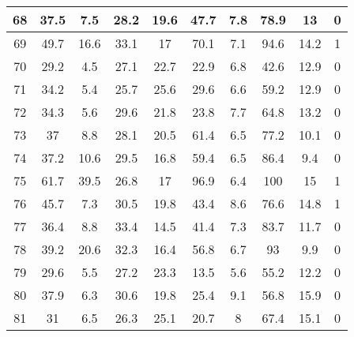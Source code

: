 \begin{longtable} {|c|c|c|c|c|c|c|c|c|c|}
68                            &        37.5&         7.5&        28.2&        19.6&        47.7&         7.8&        78.9&          13&           0\\\hline
69                            &        49.7&        16.6&        33.1&          17&        70.1&         7.1&        94.6&        14.2&           1\\\hline
70                            &        29.2&         4.5&        27.1&        22.7&        22.9&         6.8&        42.6&        12.9&           0\\\hline
71                            &        34.2&         5.4&        25.7&        25.6&        29.6&         6.6&        59.2&        12.9&           0\\\hline
72                            &        34.3&         5.6&        29.6&        21.8&        23.8&         7.7&        64.8&        13.2&           0\\\hline
73                            &          37&         8.8&        28.1&        20.5&        61.4&         6.5&        77.2&        10.1&           0\\\hline
74                            &        37.2&        10.6&        29.5&        16.8&        59.4&         6.5&        86.4&         9.4&           0\\\hline
75                            &        61.7&        39.5&        26.8&          17&        96.9&         6.4&         100&          15&           1\\\hline
76                            &        45.7&         7.3&        30.5&        19.8&        43.4&         8.6&        76.6&        14.8&           1\\\hline
77                            &        36.4&         8.8&        33.4&        14.5&        41.4&         7.3&        83.7&        11.7&           0\\\hline
78                            &        39.2&        20.6&        32.3&        16.4&        56.8&         6.7&          93&         9.9&           0\\\hline
79                            &        29.6&         5.5&        27.2&        23.3&        13.5&         5.6&        55.2&        12.2&           0\\\hline
80                            &        37.9&         6.3&        30.6&        19.8&        25.4&         9.1&        56.8&        15.9&           0\\\hline
81                            &          31&         6.5&        26.3&        25.1&        20.7&           8&        67.4&        15.1&           0\\\hline

\end{longtable}
